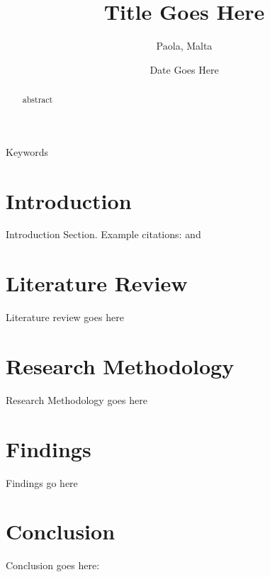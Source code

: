 \documentclass[conference]{IEEEtran}
\begin{document}
\title{Title Goes Here}

\author{
Paola, Malta
}

\date{Date Goes Here}

\maketitle

\begin{abstract}
abstract
\end{abstract}

\begin{IEEEkeywords}
Keywords
\end{IEEEkeywords}

\section{Introduction}

Introduction Section. Example citations: \cite{ronneberger2015unet} and \cite{latex2e}

\section{Literature Review}

Literature review goes here

\section{Research Methodology}

Research Methodology goes here

\section{Findings}

Findings go here

\section{Conclusion}

Conclusion goes here:



\end{document}

